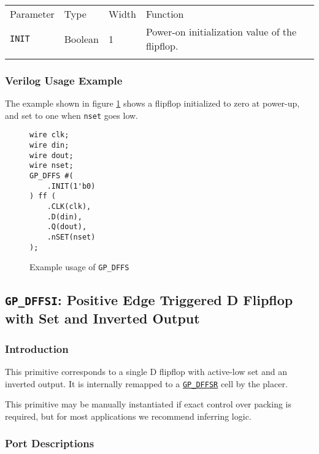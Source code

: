 \documentclass[11pt]{article}
\newcommand{\tokenstyle}[1]{\texttt{#1}}
\newcommand{\wirestyle}[1]{\texttt{#1}}
\newcommand{\whenstyle}[1]{{\fontseries{sb}\selectfont#1}}
\newcommand{\tokenref}[2]{\hyperref[#2]{\tokenstyle{#1}}}
\newcommand{\thinhline}{\Xhline{1\arrayrulewidth}}
\newcommand{\thickhline}{\Xhline{2.5\arrayrulewidth}}
\begin{document}
\begin{tabularx}{\textwidth}{lllX}
\thinhline
\whenstyle{Parameter} & \whenstyle{Type} & \whenstyle{Width} & \whenstyle{Function} \\
\thickhline
\tokenstyle{INIT} & Boolean & 1 & Power-on initialization value of the flipflop. \\
\thinhline
\end{tabularx}

\subsubsection{Verilog Usage Example}

The example shown in figure \ref{gp-dffs-example} shows a flipflop initialized to zero at power-up, and set to one
when \wirestyle{nset} goes low.

\begin{figure}[h]
\begin{lstlisting}
wire clk;
wire din;
wire dout;
wire nset;
GP_DFFS #(
	.INIT(1'b0)
) ff (
	.CLK(clk),
	.D(din),
	.Q(dout),
	.nSET(nset)
);
\end{lstlisting}
\caption{Example usage of \tokenstyle{GP\_DFFS}}
\label{gp-dffs-example}
\end{figure}


\pagebreak
\subsection{\tokenstyle{GP\_DFFSI}: Positive Edge Triggered D Flipflop with Set and Inverted Output}
\label{gp-dffs}

\subsubsection{Introduction}
This primitive corresponds to a single D flipflop with active-low set and an inverted output. It is internally remapped
to a \tokenref{GP\_DFFSR}{gp-dffsr} cell by the placer.

This primitive may be manually instantiated if exact control over packing is required, but for most applications we
recommend inferring logic.

\subsubsection{Port Descriptions}
\end{document}
